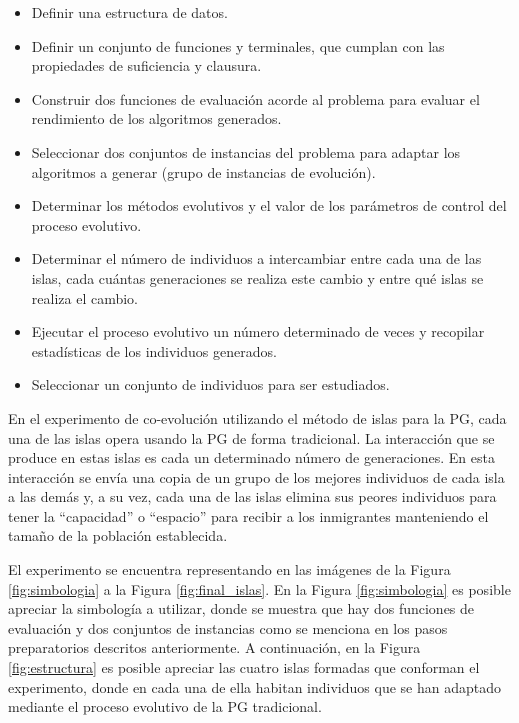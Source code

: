 \begin{itemize}
  \item Definir una estructura de datos.
  \item Definir un conjunto de funciones y terminales, que cumplan con las propiedades de suficiencia y clausura.
  \item Construir dos funciones de evaluación acorde al problema para evaluar el rendimiento de los algoritmos generados.
  \item Seleccionar dos conjuntos de instancias del problema para adaptar los algoritmos a generar (grupo de instancias de evolución).
  \item Determinar los métodos evolutivos y el valor de los parámetros de control del proceso evolutivo.
  \item Determinar el número de individuos a intercambiar entre cada una de las islas, cada cuántas generaciones se realiza este cambio y entre qué islas se realiza el cambio.
  \item Ejecutar el proceso evolutivo un número determinado de veces y recopilar estadísticas de los individuos generados.
  \item Seleccionar un conjunto de individuos para ser estudiados.
\end{itemize}

En el experimento de co-evolución utilizando el método de islas para la PG, cada una de las islas opera usando la PG de forma tradicional. La interacción que se produce en estas islas es cada un determinado número de generaciones. En esta interacción se envía una copia de un grupo de los mejores individuos de cada isla a las demás y, a su vez, cada una de las islas elimina sus peores individuos para tener la “capacidad” o “espacio” para recibir a los inmigrantes manteniendo el tamaño de la población establecida.

El experimento se encuentra representando en las imágenes de la Figura \ref{fig:simbologia} a la Figura \ref{fig:final_islas}. En la Figura \ref{fig:simbologia} es posible apreciar la simbología a utilizar, donde se muestra que hay dos funciones de evaluación y dos conjuntos de instancias como se menciona en los pasos preparatorios descritos anteriormente. A continuación, en la Figura \ref{fig:estructura} es posible apreciar las cuatro islas formadas que conforman el experimento, donde en cada una de ella habitan individuos que se han adaptado mediante el proceso evolutivo de la PG tradicional.

